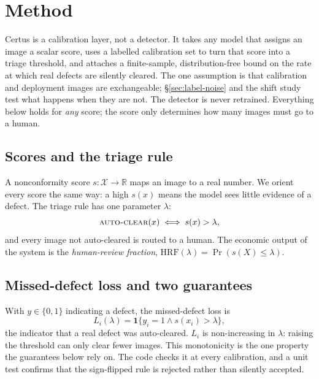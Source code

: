 
\section{Method}
\label{sec:method}

Certus is a calibration layer, not a detector. It takes any model that
assigns an image a scalar score, uses a labelled calibration set to turn
that score into a triage threshold, and attaches a finite-sample,
distribution-free bound on the rate at which real defects are silently
cleared. The one assumption is that calibration and deployment images are
exchangeable; \S\ref{sec:label-noise} and the shift study test what
happens when they are not. The detector is never retrained. Everything below holds for
\emph{any} score; the score only determines how many images must go to a
human.

\subsection{Scores and the triage rule}

A nonconformity score $s : \mathcal{X} \to \mathbb{R}$ maps an image to a
real number. We orient every score the same way: a high $s(x)$ means the
model sees little evidence of a defect. The triage rule has one parameter
$\lambda$:
\begin{equation}
  \textsc{auto-clear}(x) \iff s(x) > \lambda,
\end{equation}
and every image not auto-cleared is routed to a human. The economic output
of the system is the \emph{human-review fraction},
$\mathrm{HRF}(\lambda) = \Pr(s(X) \le \lambda)$.

\subsection{Missed-defect loss and two guarantees}

With $y \in \{0, 1\}$ indicating a defect, the missed-defect loss is
\begin{equation}
  L_i(\lambda) = \mathbf{1}\{y_i = 1 \wedge s(x_i) > \lambda\},
\end{equation}
the indicator that a real defect was auto-cleared. $L_i$ is non-increasing
in $\lambda$: raising the threshold can only clear fewer images. This
monotonicity is the one property the guarantees below rely on. The code
checks it at every calibration, and a unit test confirms that the
sign-flipped rule is rejected rather than silently accepted.

